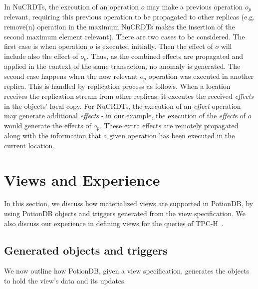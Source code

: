 \documentclass[sigplan,twocolumn,review,anonymous]{acmart}
\newcommand{\code}[1]{\textsf{\small{#1}}}
\begin{document}
In NuCRDTs, the execution of an operation $o$ may make a previous operation  $o_{p}$
relevant, requiring this previous operation to be propagated to other replicas  
(e.g.  \code{remove(n)} operation in the maximum NuCRDTs makes the insertion of the second
maximum element relevant). There are two cases to be considered.
%
The first case is when operation $o$ is executed initially. Then the effect of
$o$ will include also the effect of $o_{p}$. Thus, as the combined effects are propagated and applied in 
the context of the same transaction, no anomaly is generated.
%
The second case happens when the now relevant $o_{p}$ operation was executed in  
another replica.  This is handled by replication process as follows.  When a location receives
the replication stream from other replicas, it executes the received \emph{effects} in the objects' local copy.
For NuCRDTs, the execution of an \emph{effect} operation may generate additional 
\emph{effects} - in our example, the execution of the \emph{effect}s of $o$ would generate
the effects of $o_{p}$. These extra effects are remotely propagated 
along with the 
information that a given operation has been executed in the current location. 

\section{Views and Experience}
\label{sec:views_for_apps}

In this section, we discuss how materialized views are supported in PotionDB, by using PotionDB
objects and triggers generated from the view specification. We also discuss
our experience in defining views for the queries of TPC-H~\cite{tpch}. 

\subsection{Generated objects and triggers}
\label{subsec:generated_view}

We now outline how PotionDB, given a view specification, generates the 
objects to hold the view's data and its updates. %
\end{document}
